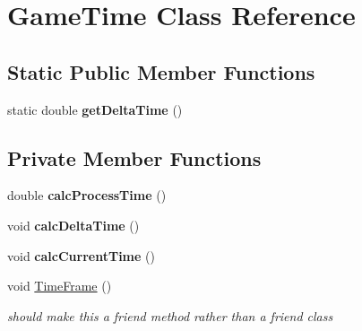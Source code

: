 \hypertarget{class_game_time}{}\section{Game\+Time Class Reference}
\label{class_game_time}
\subsection*{Static Public Member Functions}
\begin{DoxyCompactItemize}
\item 
\mbox{\label{class_game_time_aa5ea84c887116ef68d1331617c5a81c3}} 
static double {\bfseries get\+Delta\+Time} ()
\end{DoxyCompactItemize}
\subsection*{Private Member Functions}
\begin{DoxyCompactItemize}
\item 
\mbox{\label{class_game_time_ac8a380f740f5bc39e98fda3e069c0bb3}} 
double {\bfseries calc\+Process\+Time} ()
\item 
\mbox{\label{class_game_time_a8575cb09f1e07b90678eedaf92776a97}} 
void {\bfseries calc\+Delta\+Time} ()
\item 
\mbox{\label{class_game_time_aec3fa5e495f783524701418f5d679071}} 
void {\bfseries calc\+Current\+Time} ()
\item 
\mbox{\label{class_game_time_a424d4e2f4745a85897620751ff5153b9}} 
void \hyperlink{class_game_time_a424d4e2f4745a85897620751ff5153b9}{Time\+Frame} ()
\begin{DoxyCompactList}\small\item\em should make this a friend method rather than a friend class \end{DoxyCompactList}\end{DoxyCompactItemize}
